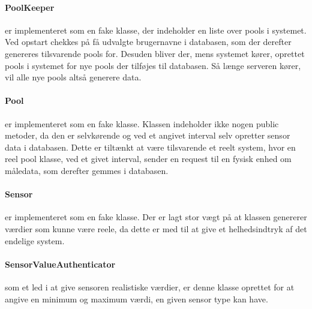 \paragraph{PoolKeeper} er implementeret som en fake klasse, der indeholder en liste over pools i systemet. Ved opstart chekkes på få udvalgte brugernavne i databasen, som der derefter genereres tilsvarende pools for. Desuden bliver der, mens systemet kører, oprettet pools i systemet for nye pools der tilføjes til databasen. Så længe serveren kører, vil alle nye pools altså generere data.

\paragraph{Pool} er implementeret som en fake klasse. Klassen indeholder ikke nogen public metoder, da den er selvkørende og ved et angivet interval selv opretter sensor data i databasen. Dette er tiltænkt at være tilsvarende et reelt system, hvor en reel pool klasse, ved et givet interval, sender en request til en fysisk enhed om måledata, som derefter gemmes i databasen.

\paragraph{Sensor} er implementeret som en fake klasse. Der er lagt stor vægt på at klassen genererer værdier som kunne være reele, da dette er med til at give et helhedsindtryk af det endelige system. 

\paragraph{SensorValueAuthenticator} som et led i at give sensoren realistiske værdier, er denne klasse oprettet for at angive en minimum og maximum værdi, en given sensor type kan have.